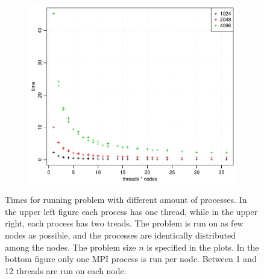 \documentclass[norsk]{article} %
\numberwithin{equation}{section} %
\numberwithin{figure}{section} %
\numberwithin{table}{section} %
\begin{document}
\begin{figure}[h!]
  \begin{subfigure}[b]{0.48\textwidth}
    \includegraphics[width=\textwidth]{./Figures/taskbTimeNodesTimesThreads.pdf}
  \end{subfigure}
  \vspace{1\baselineskip}
  \caption{Times for running problem with different amount of processes. In the upper left figure each process has one thread, while in the upper right, each process has two treads. The problem is run on as few nodes as possible, and the processes are identically distributed among the nodes. The problem size $n$ is specified in the plots. In the bottom figure only one MPI process is run per node. Between 1 and 12 threads are run on each node.}
  \label{fig:time}
\end{figure}
%
\end{document}
